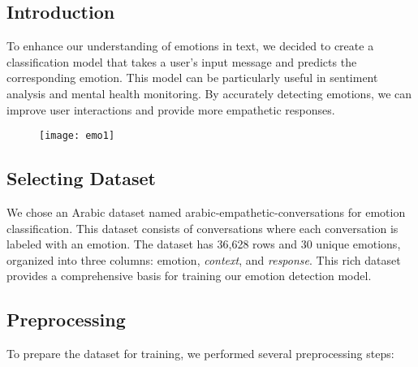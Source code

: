 \subsection{Introduction}
To enhance our understanding of emotions in text, we decided to create a classification model that takes a user's input message and predicts the corresponding emotion. This model can be particularly useful in sentiment analysis and mental health monitoring. By accurately detecting emotions, we can improve user interactions and provide more empathetic responses.

\begin{figure}[h]
\texttt{[image: emo1]}
\centering
\end{figure}

\subsection{Selecting Dataset}
We chose an Arabic dataset named {arabic-empathetic-conversations} for emotion classification. This dataset consists of conversations where each conversation is labeled with an emotion. The dataset has 36,628 rows and 30 unique emotions, organized into three columns: {emotion}, \textit{context}, and \textit{response}. This rich dataset provides a comprehensive basis for training our emotion detection model.

\subsection{Preprocessing}
To prepare the dataset for training, we performed several preprocessing steps:

